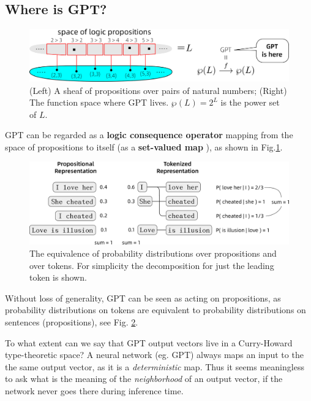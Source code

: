 \documentclass[runningheads]{llncs}
\begin{document}
\subsection{Where is GPT?}

\begin{figure}
	\includegraphics[scale=.5]{GPT-is-here.png}
	\caption{(Left) A sheaf of propositions over pairs of natural numbers; (Right) The function space where GPT lives. $\wp(L) = 2^L$ is the power set of $L$.}
	\label{fig:GPT-is-here}
\end{figure}

GPT \cite{chatGPT2020} can be regarded as a \textbf{logic consequence operator} mapping from the space of propositions to itself (as a \textbf{set-valued map} \cite{Aubin1990}), as shown in Fig.\ref{fig:GPT-is-here}.

\begin{figure}
	\includegraphics[scale=.4]{I-love-her-she-is-bitch.png}	%
	\caption{The equivalence of probability distributions over propositions and over tokens. For simplicity the decomposition for just the leading token is shown.} \label{fig:she-is-bitch}
\end{figure}

Without loss of generality, GPT can be seen as acting on propositions, as probability distributions on tokens are equivalent to probability distributions on sentences (propositions), see Fig. \ref{fig:she-is-bitch}.

To what extent can we say that GPT output vectors live in a Curry-Howard type-theoretic space?  A neural network (eg. GPT) always maps an input to the the same output vector, as it is a \textit{deterministic} map. Thus it seems meaningless to ask what is the meaning of the \textit{neighborhood} of an output vector, if the network never goes there during inference time.
\end{document}

